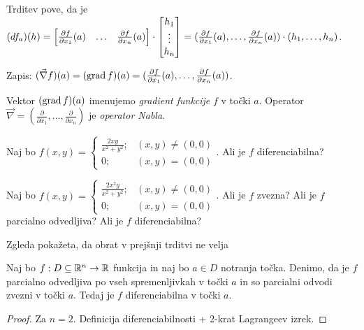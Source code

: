 \begin{opomba}
    Trditev pove, da je $(df_a)(h) = \begin{bmatrix}
        \frac{\partial f}{\partial x_1}(a) & \ldots & \frac{\partial f}{\partial x_n}(a) 
    \end{bmatrix} \cdot \begin{bmatrix}
        h_1 \\ \vdots \\ h_n
    \end{bmatrix} = (\frac{\partial f}{\partial x_1}(a), \ldots, \frac{\partial f}{\partial x_n}(a)) \cdot (h_1, \ldots, h_n)$.

    Zapis: $(\vec{\nabla} f) (a) = (\operatorname{grad} f)(a) = (\frac{\partial f}{\partial x_1}(a), \ldots, \frac{\partial f}{\partial x_n}(a))$.

    Vektor $(\operatorname{grad} f)(a)$ imenujemo \emph{gradient funkcije} $f$ v točki $a$. Operator $\vec{\nabla} = (\frac{\partial}{\partial x_1}, \ldots, \frac{\partial}{\partial x_n})$ je \emph{operator Nabla}.
\end{opomba}

\begin{zgled}
    Naj bo $f(x,y) = \begin{cases}
        \frac{2xy}{x^2+y^2}; &(x,y) \neq (0,0) \\
        0; &(x,y) = (0,0)
    \end{cases}$. Ali je $f$ diferenciabilna?
\end{zgled}

\begin{zgled}
    Naj bo $f(x,y) = \begin{cases}
        \frac{2x^2y}{x^2+y^2}; &(x,y) \neq (0,0) \\
        0; &(x,y) = (0,0)
    \end{cases}$. Ali je $f$ zvezna? Ali je $f$ parcialno odvedljiva? Ali je $f$ diferenciabilna?
\end{zgled}

\begin{opomba}
    Zgleda pokažeta, da obrat v prejšnji trditvi ne velja
\end{opomba}

\begin{izrek}
    Naj bo $f: D \subseteq \mathbb{R}^n \to \mathbb{R}$ funkcija in naj bo $a \in D$ notranja točka. Denimo, da je $f$ parcialno odvedljiva po vseh spremenljivkah v točki $a$ in so parcialni odvodi zvezni v točki $a$. Tedaj je $f$ diferenciabilna v točki $a$.
\end{izrek}

\begin{proof}
    Za $n=2$. Definicija diferenciabilnosti + 2-krat Lagrangeev izrek.
\end{proof}

